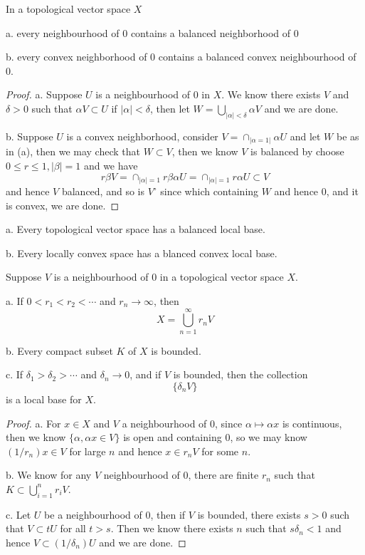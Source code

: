 \documentclass[lang=en, color=blue, ]{elegantbook}
\begin{document}
\begin{theorem}
    In a topological vector space $X$\par
    a. every neighbourhood of $0$ contains a balanced neighborhood of $0$\par
    b. every convex neighborhood of $0$ contains a balanced convex neighbourhood of $0$.
\end{theorem}
\begin{proof}
    a. Suppose $U$ is a neighbourhood of $0$ in $X$. We know there exists $V$ and $\delta > 0$ such that $\alpha V\subset U$ if $|\alpha| < \delta$, then let $W = \bigcup_{|\alpha| <\delta} \alpha V$ and we are done.\par
    b. Suppose $U$ is a convex neighborhood, consider $V = \cap_{|\alpha = 1|}\alpha U$ and let $W$ be as in (a), then we may check that $W\subset V$, then we know $V$ is balanced by choose $0\leq r \leq 1,|\beta| = 1$ and we have
    \[
    r\beta V = \cap_{|\alpha| = 1} r\beta \alpha U = \cap_{|\alpha| = 1}r\alpha U \subset V 
    \]
    and hence $V$ balanced, and so is $V^{\circ}$ since which containing $W$ and hence $0$, and it is convex, we are done.
\end{proof}

\begin{corollary}
    a. Every topological vector space has a balanced local base.\par
    b. Every locally convex space has a blanced convex local base.
\end{corollary}

\begin{theorem}
    Suppose $V$ is a neighbourhood of $0$ in a topological vector space $X$.\par
    a. If $0 < r_1<r_2<\cdots$ and $r_n \to \infty$, then
    \[X = \bigcup_{n=1}^{\infty} r_n V\]\par
    b. Every compact subset $K$ of $X$ is bounded.\par
    c. If $\delta_1>\delta_2>\cdots$ and $\delta_n \to 0$, and if $V$ is bounded, then the collection
    \[\{\delta_n V\}\]
    is a local base for $X$.
\end{theorem}
\begin{proof}
    a. For $x\in X$ and $V$ a neighbourhood of $0$, since $\alpha \mapsto \alpha x$ is continuous, then we know $\{\alpha, \alpha x \in V\}$ is open and containing $0$, so we may know $(1/r_n)x \in V$ for large $n$ and hence $x\in r_n V$ for some $n$.\par
    b. We know for any $V$ neighbourhood of $0$, there are finite $r_n$ such that $K \subset \bigcup_{i=1}^n r_i V$.\par
    c. Let $U$ be a neighbourhood of $0$, then if $V$ is bounded, there exists $s>0$ such that $V\subset tU$ for all $t>s$. Then we know there exists $n$ such that $s\delta_n < 1$ and hence $V\subset (1/\delta_n) U$ and we are done.
\end{proof}
\end{document}
